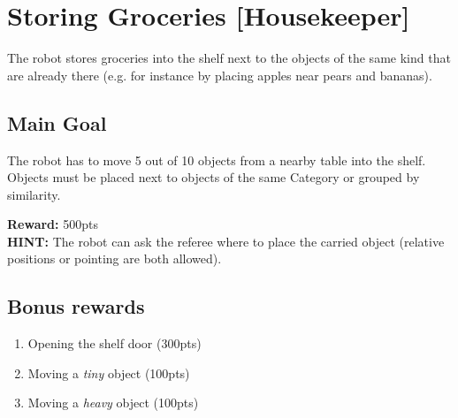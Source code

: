 \section{Storing Groceries [Housekeeper]}
The robot stores groceries into the shelf next to the objects of the same kind that are already there (e.g. for instance by placing apples near pears and bananas).


\subsection{Main Goal}
The robot has to move 5 out of 10 objects from a nearby table into the shelf. Objects must be placed next to objects of the same Category or grouped by similarity.

\noindent\textbf{Reward:} 500pts\\

\noindent\textbf{HINT:} The robot can ask the referee where to place the carried object (relative positions or pointing are both allowed).

\subsection{Bonus rewards}
\begin{enumerate}[nosep]
	\item Opening the shelf door (300pts)
	\item Moving a \emph{tiny} object (100pts)
	\item Moving a \emph{heavy} object (100pts)
\end{enumerate}

%
%
